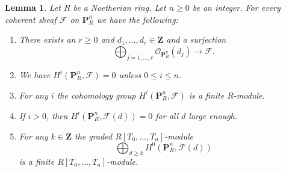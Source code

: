 \documentclass{amsart}
\theoremstyle{plain}
\newtheorem{lemma}[subsection]{Lemma}
\theoremstyle{definition}
\theoremstyle{remark}
\numberwithin{equation}{subsection}
\begin{document}
\begin{lemma}
\label{lemma-coherent-projective}
Let $R$ be a Noetherian ring.
Let $n \geq 0$ be an integer.
For every coherent sheaf $\mathcal{F}$ on $\mathbf{P}^n_R$
we have the following:
\begin{enumerate}
\item There exists an $r \geq 0$ and
$d_1, \ldots, d_r \in \mathbf{Z}$ and a surjection
$$
\bigoplus\nolimits_{j = 1, \ldots, r}
\mathcal{O}_{\mathbf{P}^n_R}(d_j)
\longrightarrow
\mathcal{F}.
$$
\item We have $H^i(\mathbf{P}^n_R, \mathcal{F}) = 0$ unless
$0 \leq i \leq n$.
\item For any $i$ the cohomology group $H^i(\mathbf{P}^n_R, \mathcal{F})$
is a finite $R$-module.
\item If $i > 0$, then
$H^i(\mathbf{P}^n_R, \mathcal{F}(d)) = 0$ for all $d$ large enough.
\item For any $k \in \mathbf{Z}$ the graded $R[T_0, \ldots, T_n]$-module
$$
\bigoplus\nolimits_{d \geq k} H^0(\mathbf{P}^n_R, \mathcal{F}(d))
$$
is a finite $R[T_0, \ldots, T_n]$-module.
\end{enumerate}
\end{lemma}
\end{document}
